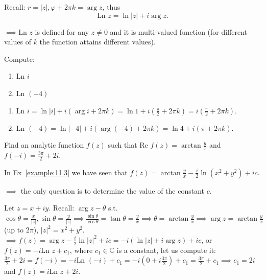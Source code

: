 Recall: $r = |z|, \varphi + 2\pi k = \arg z$, thus 
\begin{equation*}\label{equation:ln_z_formula}
    \text{Ln } z = \ln |z| + i \arg z. \tag{*}
\end{equation*}

$\implies \text{Ln } z$ is defined for any $z \neq 0$ and it is multi-valued function (for different values of $k$ the function attains different values).

\begin{example}\label{example:17.1} 
    Compute:
    \begin{enumerate}
        \item $\text{Ln } i$
        \item $\text{Ln } (-4)$
    \end{enumerate}

    \begin{soln}
        \begin{enumerate}
            \item $\text{Ln } i = \ln |i| + i(\arg i + 2\pi k) = \ln 1 + i(\frac{\pi}{2} + 2\pi k) = i(\frac{\pi}{2} + 2\pi k)$.
            \item $\text{Ln } (-4) = \ln |-4| + i(\arg(-4) + 2\pi k) = \ln 4 + i(\pi + 2\pi k)$.
        \end{enumerate}
    \end{soln}
\end{example}
\begin{example} \label{example:17.2}
     Find an analytic function $f(z)$ such that $\text{Re } f(z) = \arctan \frac{y}{x}$ and $f(-i) = \frac{3\pi}{2} + 2i$.
\begin{soln}
    
    In Ex~\ref{example:11.3} we have seen that $f(z) = \arctan \frac{y}{x} - \frac{i}{2} \ln(x^2 + y^2) + ic$.
    
    $\implies$ the only question is to determine the value of the constant $c$.
    
    Let $z = x + iy$. Recall: $\arg z - \theta$ s.t. $\cos \theta = \frac{x}{|z|}, \sin \theta = \frac{y}{|z|} \implies \frac{\sin \theta}{\cos \theta} = \tan \theta = \frac{y}{x} \implies \theta = \arctan \frac{y}{x} \implies \arg z = \arctan \frac{y}{x}$ (up to $2\pi$), $|z|^2 = x^2 + y^2$.
    $\implies f(z) = \arg z - \frac{i}{2} \ln |z|^2 + ic = -i(\ln|z| + i \arg z) + ic$, or $f(z) = -i \text{Ln } z + c_1$, where $c_1 \in \mathbb{C}$ is a constant, let us compute it: $\frac{3\pi}{2} + 2i = f(-i) = -i\text{Ln }(-i) + c_1 = -i(0 + i\frac{3\pi}{2}) + c_1 = \frac{3\pi}{2} + c_1 \implies c_1 = 2i$ and $f(z) = i\text{Ln } z + 2i$.
\end{soln}
\end{example}

